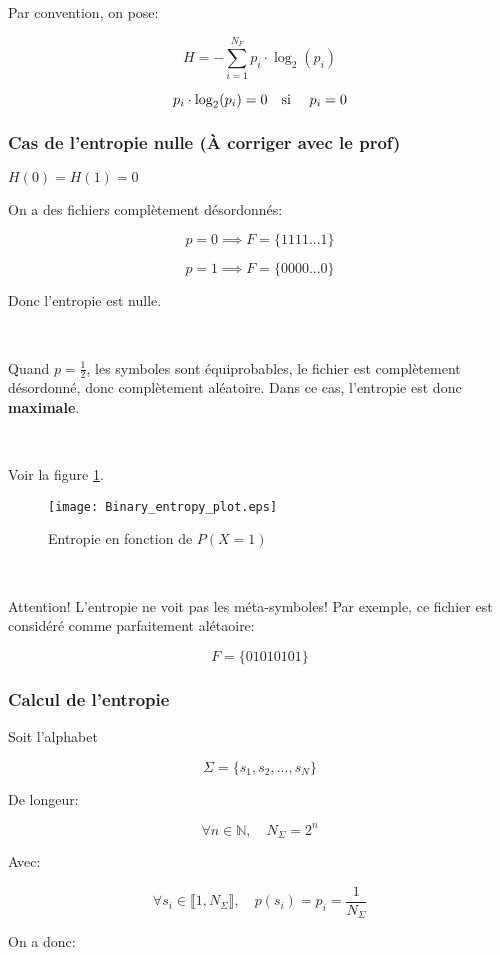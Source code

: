 \documentclass[a4paper,11pt]{article}
\newcommand{\N}{\mathbb{N}}
\newcommand{\ti}{\cdot}
\begin{document}
Par convention, on pose:

$$ H = - \sum_{i = 1}^{N_F}p_i \ti \log_2(p_i) $$

$$ p_i \ti \log_2(p_i) = 0 \text{\quad si \quad} p_i = 0 $$

\subsubsection{Cas de l'entropie nulle (À corriger avec le prof)}

$H(0) = H(1) = 0$

On a des fichiers complètement désordonnés:

$$ p = 0 \implies F = \{1111...1\} $$

$$ p = 1 \implies F = \{0000...0\} $$

Donc l'entropie est nulle.


\

Quand $p = \frac{1}{2}$, les symboles sont équiprobables, le fichier est
complètement désordonné, donc complètement aléatoire. Dans ce cas, l'entropie
est donc \textbf{maximale}.

\

Voir la figure \ref{entropy_prob}.

\begin{figure}[!h]
  \centering
  \texttt{[image: Binary\_entropy\_plot.eps]}
  \caption{Entropie en fonction de $P(X = 1)$}
  \label{entropy_prob}
\end{figure}

\

Attention! L'entropie ne voit pas les méta-symboles! Par exemple, ce fichier
est considéré comme parfaitement alétaoire:

$$ F = \{01010101\} $$

\subsubsection{Calcul de l'entropie}

Soit l'alphabet

$$ \Sigma = \{s_1, s_2, ..., s_N\} $$

De longeur:

$$ \forall n \in \N, \quad N_{\Sigma}= 2^n $$

Avec:

$$ \forall s_i \in \llbracket 1, N_{\Sigma} \rrbracket, \quad p(s_i) = p_i = \frac{1}{N_{\Sigma}} $$

On a donc:
\end{document}

